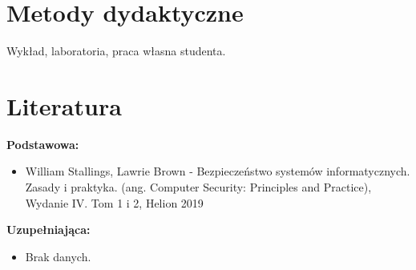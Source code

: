 \documentclass[12pt, a4paper]{article}
\begin{document}
\section{Metody dydaktyczne}

Wykład, laboratoria, praca własna studenta.

\section{Literatura}

\textbf{Podstawowa:}
\begin{itemize}
  \item William Stallings, Lawrie Brown - Bezpieczeństwo systemów informatycznych. Zasady i praktyka. (ang. Computer Security: Principles and Practice), Wydanie IV. Tom 1 i 2, Helion 2019
\end{itemize}

\textbf{Uzupełniająca:}
\begin{itemize}
  \item Brak danych.
\end{itemize}
\end{document}

